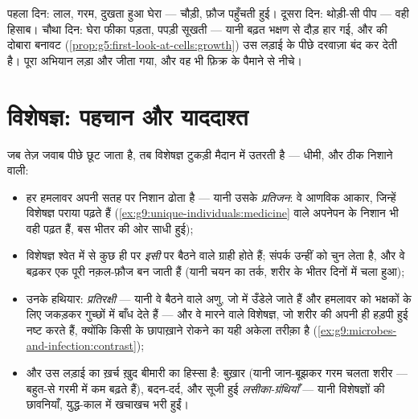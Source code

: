 \begin{example}[भरते हुए कटाव को पढ़ना]\label{ex:g9:immune-defenses:cut}
पहला दिन: लाल, गरम, दुखता हुआ घेरा ---  चौड़ी, फ़ौज पहुँचती हुई।
दूसरा दिन: थोड़ी-सी पीप --- वही हिसाब। चौथा दिन: घेरा फीका पड़ता, पपड़ी
सूखती --- यानी बढ़त भक्षण से दौड़ हार गई, और  की दोबारा बनावट
(\cref{prop:g5:first-look-at-cells:growth}) उस लड़ाई के पीछे दरवाज़ा बंद
कर देती है। पूरा अभियान लड़ा और जीता गया, और वह भी फ़िक्र के पैमाने से
नीचे।
\end{example}

\section{विशेषज्ञ: पहचान और याददाश्त}

\begin{proposition}[ख़ास जवाब]\label{prop:g9:immune-defenses:specific}
जब तेज़ जवाब पीछे छूट जाता है, तब विशेषज्ञ टुकड़ी मैदान में उतरती है ---
धीमी, और ठीक निशाने वाली:
\begin{itemize}
  \item हर हमलावर अपनी सतह पर निशान ढोता है --- यानी उसके
        \emph{प्रतिजन}: वे आणविक आकार, जिन्हें विशेषज्ञ
        पराया पढ़ते हैं (\cref{ex:g9:unique-individuals:medicine} वाले
        अपनेपन के निशान भी वही पढ़त हैं, बस भीतर की ओर साधी हुई);
  \item विशेषज्ञ श्वेत  में से कुछ ही पर \emph{इसी}  पर
        बैठने वाले ग्राही होते हैं; संपर्क उन्हीं को चुन लेता है, और वे
        बढ़कर एक पूरी नक़ल-फ़ौज बन जाती हैं (यानी चयन का तर्क, शरीर के
        भीतर दिनों में चला हुआ);
  \item उनके हथियार: \emph{प्रतिरक्षी} --- यानी वे
        बैठने वाले अणु, जो  में उँडेले जाते हैं और हमलावर को भक्षकों
        के लिए जकड़कर गुच्छों में बाँध देते हैं --- और वे मारने वाले
        विशेषज्ञ, जो शरीर की अपनी ही हड़पी हुई  नष्ट करते हैं,
        क्योंकि किसी  के छापाख़ाने रोकने का यही अकेला तरीक़ा है
        (\cref{ex:g9:microbes-and-infection:contrast});
  \item और उस लड़ाई का ख़र्च ख़ुद बीमारी का हिस्सा है: बुख़ार (यानी
        जान-बूझकर गरम चलता शरीर --- बहुत-से  गरमी में कम बढ़ते
        हैं), बदन-दर्द, और सूजी हुई \emph{लसीका-ग्रंथियाँ} --- यानी
        विशेषज्ञों की छावनियाँ, युद्ध-काल में खचाखच भरी हुईं।
\end{itemize}
\end{proposition}
\admitted

